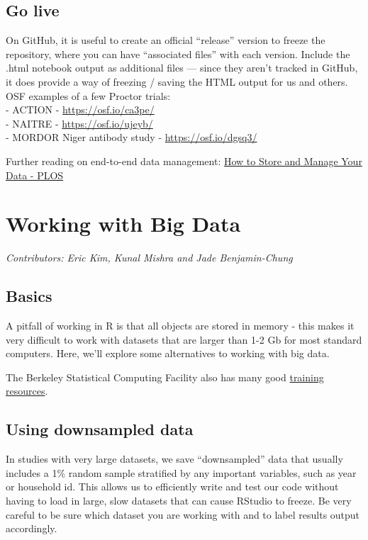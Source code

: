 \documentclass[
]{book}
\begin{document}
\section{Go live}\label{go-live}

On GitHub, it is useful to create an official ``release'' version to freeze the repository, where you can have ``associated files'' with each version. Include the .html notebook output as additional files --- since they aren't tracked in GitHub, it does provide a way of freezing / saving the HTML output for us and others. OSF examples of a few Proctor trials:\\
- ACTION - \url{https://osf.io/ca3pe/}\\
- NAITRE - \url{https://osf.io/ujeyb/}\\
- MORDOR Niger antibody study - \url{https://osf.io/dgsq3/}

Further reading on end-to-end data management: \href{https://plos.org/resource/how-to-store-and-manage-your-data/#data-management-plan}{How to Store and Manage Your Data - PLOS}

\chapter{Working with Big Data}\label{bigdata}

\emph{Contributors: Eric Kim, Kunal Mishra and Jade Benjamin-Chung}

\section{Basics}\label{basics}

A pitfall of working in R is that all objects are stored in memory - this makes it very difficult to work with datasets that are larger than 1-2 Gb for most standard computers. Here, we'll explore some alternatives to working with big data.

The Berkeley Statistical Computing Facility also has many good \href{http://statistics.berkeley.edu/computing/training}{training resources}.

\section{Using downsampled data}\label{using-downsampled-data}

In studies with very large datasets, we save ``downsampled'' data that usually includes a 1\% random sample stratified by any important variables, such as year or household id. This allows us to efficiently write and test our code without having to load in large, slow datasets that can cause RStudio to freeze. Be very careful to be sure which dataset you are working with and to label results output accordingly.
\end{document}
